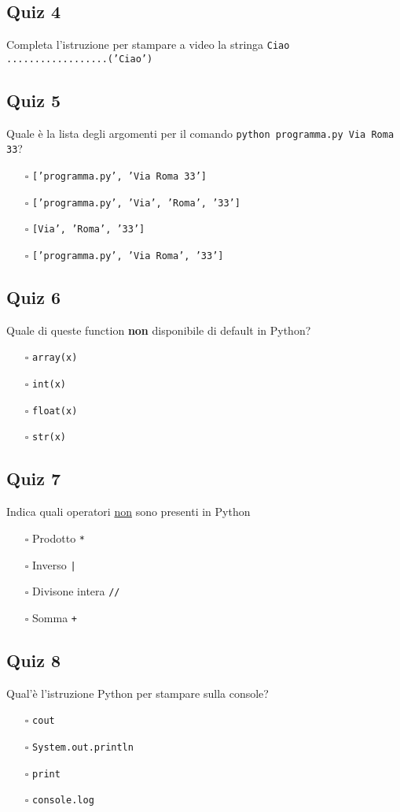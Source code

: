 \documentclass{article}
\begin{document}
\subsection*{Quiz 4}
Completa l'istruzione per stampare a video la stringa \texttt{Ciao}\\
\verb|..................|\texttt{('Ciao')}\subsection*{Quiz 5}
Quale è la lista degli argomenti per il comando \texttt{python programma.py Via Roma 33}?
\begin{itemize}
  \item[$\square$] \texttt{['programma.py', 'Via Roma 33']}
  \item[$\square$] \texttt{['programma.py', 'Via', 'Roma', '33']}
  \item[$\square$] \texttt{[Via', 'Roma', '33']}
  \item[$\square$] \texttt{['programma.py', 'Via Roma', '33']}
\end{itemize}
\subsection*{Quiz 6}
Quale di queste function \textbf{non} disponibile di default in Python?
\begin{itemize}
  \item[$\square$] \texttt{array(x)}
  \item[$\square$] \texttt{int(x)}
  \item[$\square$] \texttt{float(x)}
  \item[$\square$] \texttt{str(x)}
\end{itemize}
\subsection*{Quiz 7}
Indica quali operatori \underline{non} sono presenti in Python
\begin{itemize}
  \item[$\square$] Prodotto \texttt{*}
  \item[$\square$] Inverso \texttt{|}
  \item[$\square$] Divisone intera \texttt{//}
  \item[$\square$] Somma \texttt{+}
\end{itemize}
\subsection*{Quiz 8}
Qual'è l'istruzione Python per stampare sulla console?
\begin{itemize}
  \item[$\square$] \texttt{cout}
  \item[$\square$] \texttt{System.out.println}
  \item[$\square$] \texttt{print}
  \item[$\square$] \texttt{console.log}
\end{itemize}
\end{document}
